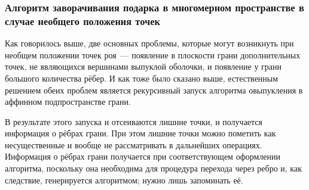 \documentclass[14pt]{extarticle}
\begin{document}
%
%

\subsubsection{Алгоритм заворачивания подарка в многомерном пространстве в случае необщего положения точек}
\label{sec:generic}

Как говорилось выше, две основных проблемы, которые могут возникнуть при необщем положении точек роя~--- появление в плоскости грани дополнительных точек, не являющихся вершинами выпуклой оболочки, и появление у грани большого количества рёбер. И как тоже было сказано выше, естественным решением обеих проблем является рекурсивный запуск алгоритма овыпукления в аффинном подпространстве грани.

В результате этого запуска и отсеиваются лишние точки, и получается информация о рёбрах грани. При этом лишние точки можно пометить как несущественные и вообще не рассматривать в дальнейших операциях. Информация о рёбрах грани получается при соответствующем оформлении алгоритма, поскольку она необходима для процедура перехода через ребро и, как следствие, генерируется алгоритмом; нужно лишь запоминать её.
\end{document}
